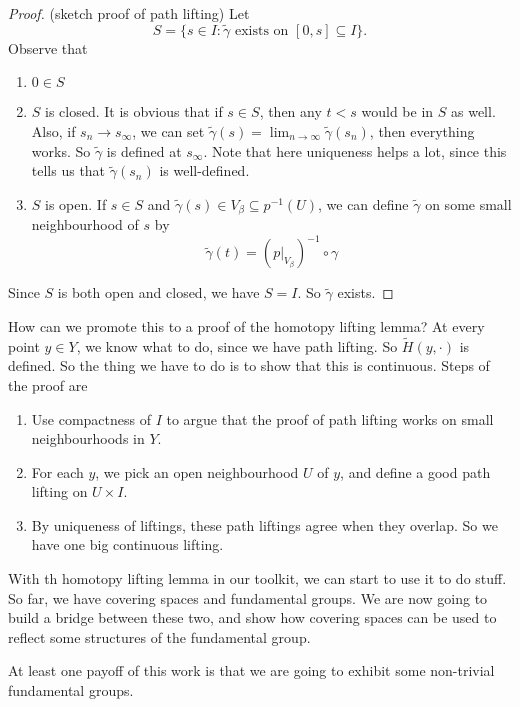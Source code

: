 \documentclass[a4paper]{article}
\begin{document}
\begin{proof}(sketch proof of path lifting)
  Let
  \[
    S = \{s \in I: \tilde{\gamma}\text{ exists on }[0, s] \subseteq I\}.
  \]
  Observe that
  \begin{enumerate}
    \item $0\in S$
    \item $S$ is closed. It is obvious that if $s \in S$, then any $t < s$ would be in $S$ as well. Also, if $s_n \to s_{\infty}$, we can set $\tilde{\gamma}(s) = \lim_{n \to \infty}\tilde{\gamma}(s_n)$, then everything works. So $\tilde{\gamma}$ is defined at $s_{\infty}$. Note that here uniqueness helps a lot, since this tells us that $\tilde{\gamma}(s_n)$ is well-defined.

    \item $S$ is open. If $s\in S$ and $\tilde{\gamma}(s) \in V_\beta \subseteq p^{-1}(U)$, we can define $\tilde{\gamma}$ on some small neighbourhood of $s$ by
      \[
        \tilde{\gamma}(t) = (p|_{V_\beta})^{-1}\circ \gamma
      \]
  \end{enumerate}
  Since $S$ is both open and closed, we have $S = I$. So $\tilde{\gamma}$  exists.
\end{proof}
How can we promote this to a proof of the homotopy lifting lemma? At every point $y\in Y$, we know what to do, since we have path lifting. So $\tilde{H}(y, \cdot)$ is defined. So the thing we have to do is to show that this is continuous. Steps of the proof are
\begin{enumerate}
  \item Use compactness of $I$ to argue that the proof of path lifting works on small neighbourhoods in $Y$.
  \item For each $y$, we pick an open neighbourhood $U$ of $y$, and define a good path lifting on $U\times I$.
  \item By uniqueness of liftings, these path liftings agree when they overlap. So we have one big continuous lifting.
\end{enumerate}

With th homotopy lifting lemma in our toolkit, we can start to use it to do stuff. So far, we have covering spaces and fundamental groups. We are now going to build a bridge between these two, and show how covering spaces can be used to reflect some structures of the fundamental group.

At least one payoff of this work is that we are going to exhibit some non-trivial fundamental groups.
\end{document}
